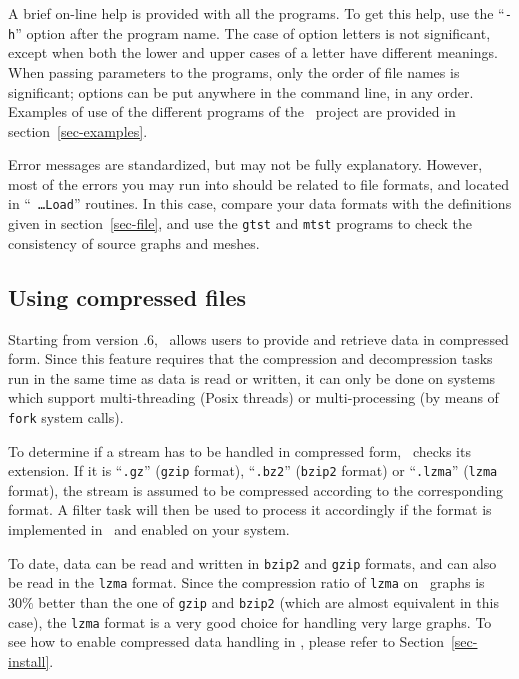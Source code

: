 A brief on-line help is provided with all the programs. To get this help,
use the ``\texttt{-h}'' option after the program name.
The case of option letters is not significant, except when
both the lower and upper cases of a letter have different meanings.
When passing parameters to the programs, only the order of file names is
significant; options can be put anywhere in the command line, in any order.
Examples of use of the different programs of the \scotch\ project are provided
in section~\ref{sec-examples}.

Error messages are standardized, but may not be fully explanatory.
However, most of the errors you may run into should be related to file
formats, and located in ``\mbox{\texttt{ \ldots Load}}'' routines.
In this case, compare your data formats with the definitions
given in section~\ref{sec-file}, and use the \texttt{gtst} and \texttt{mtst}
programs to check the consistency of source graphs and meshes.

\subsection{Using compressed files}
\label{sec-prog-compressed}

Starting from version {.6}, \scotch\ allows users to provide
and retrieve data in compressed form. Since this feature requires that
the compression and decompression tasks run in the same time as data
is read or written, it can only be done on systems which support
multi-threading (Posix threads) or multi-processing (by means of
\texttt{fork} system calls).

To determine if a stream has to be handled in compressed form,
\scotch\ checks its extension. If it is ``\texttt{.gz}'' (\texttt{gzip}
format), ``\texttt{.bz2}'' (\texttt{bzip2} format) or ``\texttt{.lzma}''
(\texttt{lzma} format), the stream is assumed to be compressed according
to the corresponding format. A filter task will then be used to process
it accordingly if the format is implemented in \scotch\ and enabled on
your system.

To date, data can be read and written in \texttt{bzip2} and \texttt{gzip}
formats, and can also be read in the \texttt{lzma} format. Since the
compression ratio of \texttt{lzma} on \scotch\ graphs is $30\%$ better
than the one of \texttt{gzip} and \texttt{bzip2} (which are almost
equivalent in this case), the \texttt{lzma} format is a very good choice
for handling very large graphs. To see how to enable compressed data
handling in \scotch, please refer to Section~\ref{sec-install}.
\\

